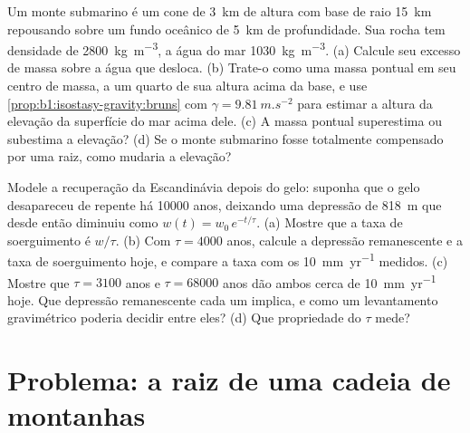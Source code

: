 \begin{exercise}[$\star\star\star$]\label{exo:b1:isostasy-gravity:11}
Um monte submarino é um cone de \qty{3}{km} de altura com base de raio \qty{15}{km}
repousando sobre um fundo oceânico de \qty{5}{km} de profundidade. Sua rocha tem densidade de
\qty{2800}{kg.m^{-3}}, a água do mar \qty{1030}{kg.m^{-3}}. (a) Calcule seu excesso
de massa sobre a água que desloca. (b) Trate-o como uma massa pontual em seu centro de
massa, a um quarto de sua altura acima da base, e use
\cref{prop:b1:isostasy-gravity:bruns} com $\gamma = \qty{9.81}{m.s^{-2}}$ para
estimar a altura da elevação da superfície do mar acima dele. (c) A massa pontual superestima ou subestima a
elevação? (d) Se o monte submarino fosse totalmente compensado por uma raiz, como mudaria a elevação?
\end{exercise}

\begin{exercise}[$\star\star\star$]\label{exo:b1:isostasy-gravity:12}
Modele a recuperação da Escandinávia depois do gelo: suponha que o gelo desapareceu de repente há \num{10000} anos, deixando uma depressão de \qty{818}{m} que desde então diminuiu como $w(t) = w_0\,e^{-t/\tau}$.
(a) Mostre que a taxa de soerguimento é $w/\tau$. (b) Com $\tau = \num{4000}$ anos, calcule a depressão remanescente
e a taxa de soerguimento hoje, e compare a taxa com os \qty{10}{mm.yr^{-1}} medidos.
(c) Mostre que $\tau = \num{3100}$ anos e $\tau = \num{68000}$ anos dão ambos cerca de \qty{10}{mm.yr^{-1}} hoje. Que depressão remanescente cada
um implica, e como um levantamento gravimétrico poderia decidir entre eles?
(d) Que propriedade do  $\tau$ mede?
\end{exercise}

\section{Problema: a raiz de uma cadeia de montanhas}

